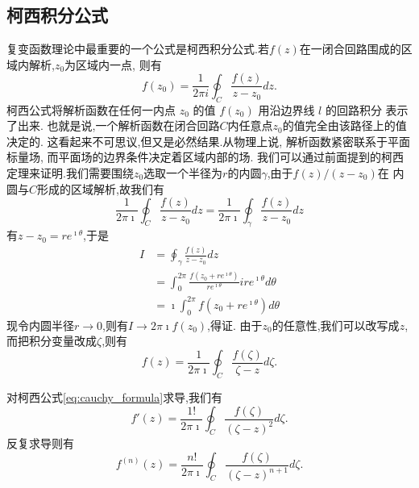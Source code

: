 \subsection{柯西积分公式}
\label{subsec:cauchy_formula}
复变函数理论中最重要的一个公式是柯西积分公式.若$f(z)$在一闭合回路围成的区域内解析,$z_0$为区域内一点,
则有
\begin{equation}
    f\left(z_0\right)=\frac{1}{2 \pi i} \oint_C \frac{f(z)}{z-z_0} d z .  
\end{equation}
柯西公式将解析函数在任何一内点 $z_0$ 的值 $f(z_0)$ 用沿边界线 $l$ 的回路积分 表示了出来.
也就是说,一个解析函数在闭合回路$C$内任意点$z_0$的值完全由该路径上的值决定的. 
这看起来不可思议,但又是必然结果.从物理上说, 解析函数紧密联系于平面标量场, 而平面场的边界条件决定着区域内部的场.
我们可以通过前面提到的柯西定理来证明.我们需要围绕$z_0$选取一个半径为$r$的内圆$\gamma$,由于$f(z)/(z-z_0)$在
内圆与$C$形成的区域解析,故我们有
\[ \frac{1}{2 \pi \imath} \oint_C \frac{f(z)}{z-z_0} d z = \frac{1}{2 \pi \imath} \oint_\gamma \frac{f(z)}{z-z_0} d z
    \]
有$z-z_0 = re^{\imath \theta}$,于是
\begin{equation}
    \begin{aligned}
        I &= \oint_\gamma \frac{f(z)}{z-z_0} d z
        \\
        & = \int _0 ^{2\pi} \frac{f(z_0 + re^{\imath \theta})}{re^{\imath \theta}} ire^{\imath \theta} d\theta
        \\
        & = \imath \int _0 ^{2\pi} f(z_0 + re^{\imath \theta}) d\theta
    \end{aligned}
\end{equation}
现令内圆半径$r\to 0$,则有$I\to 2\pi\imath f(z_0)$,得证.
由于$z_0$的任意性,我们可以改写成$z$,而把积分变量改成$\zeta$,则有
\begin{equation}
    f(z) = \frac{1}{2\pi \imath} \oint_C \frac{f(\zeta)}{\zeta - z} d \zeta.
    \label{eq:cauchy_formula}
\end{equation}

对柯西公式\eqref{eq:cauchy_formula}求导,我们有
\begin{equation}
    f'(z) = \frac{1!}{2\pi \imath} \oint_C \frac{f(\zeta)}{(\zeta - z)^2} d \zeta.
    \label{eq:cauchy_formula_1st_derivative}
\end{equation}
反复求导则有
\begin{equation}
    f^{(n)}(z) = \frac{n!}{2\pi \imath} \oint_C \frac{f(\zeta)}{(\zeta - z)^{n+1}} d \zeta.
    \label{eq:cauchy_formula_nth_derivative}
\end{equation}

